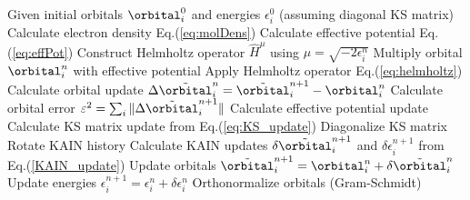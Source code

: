 \begin{algorithm}
\begin{algorithmic}[1]
\STATE Given initial orbitals $\orbital_i^0$ and energies $\epsilon_i^0$ (assuming diagonal KS matrix)
    \STATE Calculate electron density Eq.(\ref{eq:molDens})
    \STATE Calculate effective potential Eq.(\ref{eq:effPot})
	\STATE Construct Helmholtz operator $\hat{H}^{\mu}$ using $\mu = \sqrt{-2\epsilon_i^n}$
	\STATE Multiply orbital $\orbital_i^n$ with effective potential
	\STATE Apply Helmholtz operator Eq.(\ref{eq:helmholtz})
	\STATE Calculate orbital update $\Delta\tilde{\orbital}_i^n = \tilde{\orbital}_i^{n+1}-\orbital_i^n$
    \ENDFOR
    \STATE Calculate orbital error $\varepsilon^2 = \sum_i \|\Delta\tilde{\orbital}_i^{n+1}\|$
    \STATE Calculate effective potential update
    \STATE Calculate KS matrix update from Eq.(\ref{eq:KS_update})
    \STATE Diagonalize KS matrix
    \STATE Rotate KAIN history
    \STATE Calculate KAIN updates $\delta\tilde{\orbital}_i^{n+1}$ and $\delta{\epsilon}_i^{n+1}$ from Eq.(\ref{KAIN_update}) 
    \STATE Update orbitals $\tilde{\orbital}_i^{n+1} = \orbital_i^n + \delta\tilde{\orbital}_i^n$
    \STATE Update energies $\epsilon_i^{n+1} = \epsilon_i^n + \delta{\epsilon}_i^n$
    \STATE Orthonormalize orbitals (Gram-Schmidt)
\ENDWHILE
\end{algorithmic}
\end{algorithm}

\pagebreak


